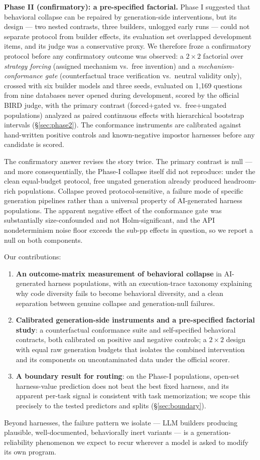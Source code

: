 \textbf{Phase II (confirmatory): a pre-specified factorial.} Phase I
suggested that behavioral collapse can be repaired by generation-side
interventions, but its design --- two nested contrasts, three builders,
unlogged early runs --- could not separate protocol from builder effects, its
evaluation set overlapped development items, and its judge was a conservative
proxy. We therefore froze a confirmatory protocol before any confirmatory
outcome was observed: a $2{\times}2$ factorial over \emph{strategy forcing}
(assigned mechanism vs.\ free invention) and a \emph{mechanism-conformance
gate} (counterfactual trace verification vs.\ neutral validity only), crossed
with six builder models and three seeds, evaluated on 1{,}169 questions from
nine databases never opened during development, scored by the official BIRD
judge, with the primary contrast (forced+gated vs.\ free+ungated populations)
analyzed as paired continuous effects with hierarchical bootstrap intervals
(\S\ref{sec:phase2}). The conformance instruments are calibrated against
hand-written positive controls and known-negative impostor harnesses before
any candidate is scored.

The confirmatory answer revises the story twice. The primary contrast is null
--- and more consequentially, the Phase-I collapse itself did not reproduce:
under the clean equal-budget protocol, free ungated generation already produced
headroom-rich populations. Collapse proved protocol-sensitive, a failure mode of
specific generation pipelines rather than a universal property of AI-generated
harness populations. The apparent negative effect of the conformance gate was
substantially size-confounded and not Holm-significant, and the API
nondeterminism noise floor exceeds the sub-pp effects in question, so we
report a null on both components.

Our contributions:
\begin{enumerate}
\def\labelenumi{\arabic{enumi}.}
\tightlist
\item
  \textbf{An outcome-matrix measurement of behavioral collapse} in
  AI-generated harness populations, with an execution-trace taxonomy
  explaining why code diversity fails to become behavioral diversity, and a
  clean separation between genuine collapse and generation-null failures.
\item
  \textbf{Calibrated generation-side instruments and a pre-specified
  factorial study}: a counterfactual conformance suite and self-specified
  behavioral contracts, both calibrated on positive and negative controls;
  a $2{\times}2$ design with equal raw generation budgets that isolates the
  combined intervention and its components on uncontaminated data under the
  official scorer.
\item
  \textbf{A boundary result for routing}: on the Phase-I populations,
  open-set harness-value prediction does not beat the best fixed harness,
  and its apparent per-task signal is consistent with task memorization;
  we scope this precisely to the tested predictors and splits
  (\S\ref{sec:boundary}).
\end{enumerate}

Beyond harnesses, the failure pattern we isolate --- LLM builders producing
plausible, well-documented, behaviorally inert variants --- is a
generation-reliability phenomenon we expect to recur wherever a model is
asked to modify its own program.
